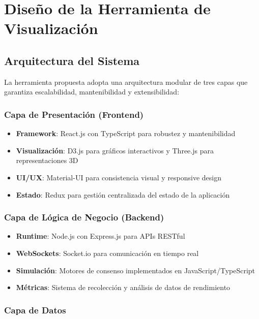 \documentclass[spanish,12pt,letterpaper]{report}
\begin{document}
\section{Diseño de la Herramienta de Visualización}

\subsection{Arquitectura del Sistema}

La herramienta propuesta adopta una arquitectura modular de tres capas que garantiza escalabilidad, mantenibilidad y extensibilidad:

\subsubsection{Capa de Presentación (Frontend)}

\begin{itemize}
    \item \textbf{Framework}: React.js con TypeScript para robustez y mantenibilidad
    \item \textbf{Visualización}: D3.js para gráficos interactivos y Three.js para representaciones 3D
    \item \textbf{UI/UX}: Material-UI para consistencia visual y responsive design
    \item \textbf{Estado}: Redux para gestión centralizada del estado de la aplicación
\end{itemize}

\subsubsection{Capa de Lógica de Negocio (Backend)}

\begin{itemize}
    \item \textbf{Runtime}: Node.js con Express.js para APIs RESTful
    \item \textbf{WebSockets}: Socket.io para comunicación en tiempo real
    \item \textbf{Simulación}: Motores de consenso implementados en JavaScript/TypeScript
    \item \textbf{Métricas}: Sistema de recolección y análisis de datos de rendimiento
\end{itemize}

\subsubsection{Capa de Datos}
\end{document}

